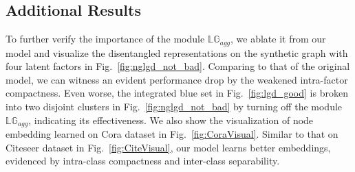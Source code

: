 \documentclass[accepted]{uai2021} %
\begin{document}
\subsection{Additional Results}
To further verify the importance of the module $\mathbb{LG}_{agg}$, we ablate it from our model and visualize the disentangled representations on the synthetic graph with four latent factors in Fig.~\ref{fig:nglgd_not_bad}. Comparing to that of the original model, we can witness an evident performance drop by the weakened intra-factor compactness. Even worse, the integrated blue set in Fig.~\ref{fig:lgd_good} is broken into two disjoint clusters in Fig.~\ref{fig:nglgd_not_bad} by turning off the module $\mathbb{LG}_{agg}$, indicating its effectiveness. We also show the visualization of node embedding learned on Cora dataset in Fig.~\ref{fig:CoraVisual}. Similar to that on Citeseer dataset in Fig.~\ref{fig:CiteVisual}, our model learns better embeddings, evidenced by intra-class compactness and inter-class separability.

\begin{table}[ht]
\centering 
\setlength{\abovecaptionskip}{2pt}\makeatletter{}\makeatother
\caption{Real-world Dataset Statistics}\label{tab:realdat_sta}
\end{table}
\end{document}

